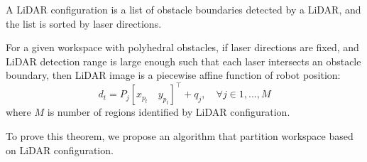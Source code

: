 \begin{definition}
    A LiDAR configuration is a list of obstacle boundaries detected by a LiDAR, and the list is sorted by laser directions.
\end{definition}

\begin{theorem}
    For a given workspace with polyhedral obstacles, if laser directions are fixed, 
    and LiDAR detection range is large enough such that each laser intersects an obstacle boundary, 
    then LiDAR image is a piecewise affine function of robot position:
    \begin{equation}
        \label{eq:image_func}
        d_t = P_j [x_{p_t} \quad y_{p_t}]^\intercal + q_j, \quad \forall j \in {1, ..., M} 
    \end{equation}
    where $M$ is number of regions identified by LiDAR configuration.
\end{theorem}    

To prove this theorem, we propose an algorithm that partition workspace based on LiDAR configuration.

